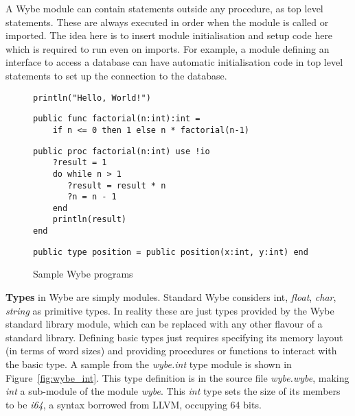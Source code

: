A Wybe module can contain statements outside any procedure, as top level
statements. These are always executed in order when the module is called or
imported. The idea here is to insert module initialisation and setup code here
which is required to run even on imports. For example, a module defining an
interface to access a database can have automatic initialisation code in top
level statements to set up the connection to the database.


\begin{figure}

\begin{Verbatim}[frame=single,label=Simple Statement,labelposition=topline,framesep=4mm,fontsize=\small,commandchars=\\\{\}]
println("Hello, World!")
\end{Verbatim}

  \begin{Verbatim}[frame=single,label=Factorial Function,labelposition=topline,framesep=4mm,fontsize=\small,commandchars=\\\{\}]
public func factorial(n:int):int =
    if n <= 0 then 1 else n * factorial(n-1)
\end{Verbatim}

    \begin{Verbatim}[frame=single,label=Factorial Procedure with IO,labelposition=topline,framesep=4mm,fontsize=\small,commandchars=\\\{\}]
public proc factorial(n:int) use !io
    ?result = 1
    do while n > 1
       ?result = result * n
       ?n = n - 1
    end
    println(result)
end
\end{Verbatim}

    \begin{Verbatim}[frame=single,label=User Types,labelposition=topline,framesep=4mm,fontsize=\small,commandchars=\\\{\}]
public type position = public position(x:int, y:int) end

\end{Verbatim}
  
  
  \caption{Sample Wybe programs}
  \label{fig:wybe_programs}
\end{figure}

\textbf{Types} in Wybe are simply modules. Standard Wybe considers {int},
\textit{float}, \textit{char}, \textit{string} as primitive types. In reality
these are just types provided by the Wybe standard library module, which can be
replaced with any other flavour of a standard library. Defining basic types
just requires specifying its memory layout (in terms of word sizes) and
providing procedures or functions to interact with the basic type. A sample
from the \textit{wybe.int} type module is shown in
Figure~\ref{fig:wybe_int}. This type definition is in the source file
\textit{wybe.wybe}, making \textit{int} a sub-module of the module
\textit{wybe}. This \textit{int} type sets the size of its members to be
\textit{i64}, a syntax borrowed from LLVM, occupying 64 bits.

